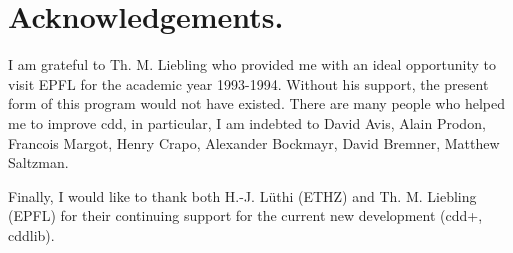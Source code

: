 \documentclass[11pt]{article}
\begin{document}
\section*{Acknowledgements.} 
I am  grateful to Th. M. Liebling who
provided me with an ideal opportunity to visit EPFL
for the academic year 1993-1994.  Without his 
support, the present form of this program would not have existed.
There are many people who helped me to improve cdd,  in particular,
I am indebted to David Avis, Alain Prodon,  Francois Margot, Henry Crapo,
Alexander Bockmayr, David Bremner, Matthew Saltzman. 

Finally, I would like to thank both H.-J. L\"uthi (ETHZ)
 and Th. M. Liebling (EPFL) for their continuing support for 
the current new development (cdd+, cddlib).  




\end{document}
